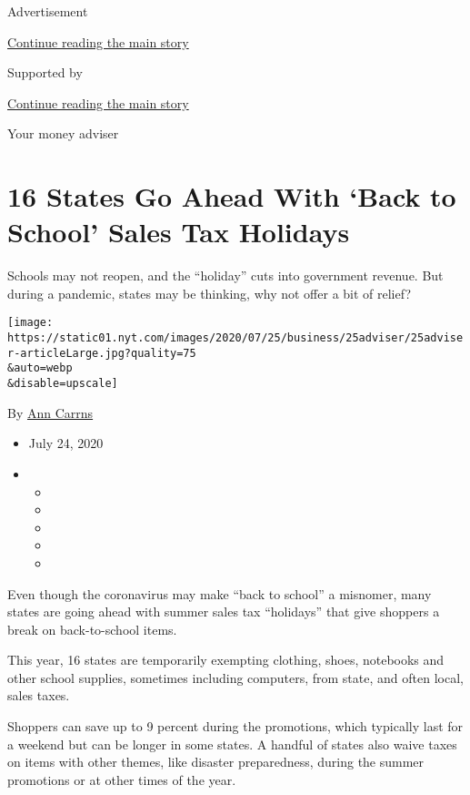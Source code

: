 Advertisement

\protect\hyperlink{after-top}{Continue reading the main story}

Supported by

\protect\hyperlink{after-sponsor}{Continue reading the main story}

Your money adviser

\hypertarget{16-states-go-ahead-with-back-to-school-sales-tax-holidays}{%
\section{16 States Go Ahead With `Back to School' Sales Tax
Holidays}\label{16-states-go-ahead-with-back-to-school-sales-tax-holidays}}

Schools may not reopen, and the ``holiday'' cuts into government
revenue. But during a pandemic, states may be thinking, why not offer a
bit of relief?

\texttt{[image: https://static01.nyt.com/images/2020/07/25/business/25adviser/25adviser-articleLarge.jpg?quality=75\\\&auto=webp\\\&disable=upscale]}

By \href{https://www.nytimes.com/by/ann-carrns}{Ann Carrns}

\begin{itemize}
\item
  July 24, 2020
\item
  \begin{itemize}
  \item
  \item
  \item
  \item
  \item
  \end{itemize}
\end{itemize}

Even though the coronavirus may make ``back to school'' a misnomer, many
states are going ahead with summer sales tax ``holidays'' that give
shoppers a break on back-to-school items.

This year, 16 states are temporarily exempting clothing, shoes,
notebooks and other school supplies, sometimes including computers, from
state, and often local, sales taxes.

Shoppers can save up to 9 percent during the promotions, which typically
last for a weekend but can be longer in some states. A handful of states
also waive taxes on items with other themes, like disaster preparedness,
during the summer promotions or at other times of the year.

